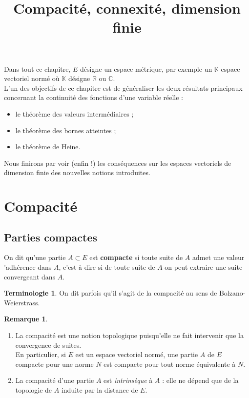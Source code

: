 \documentclass[french]{article}
\title{Compacité, connexité, dimension finie}
\date{}
\newcommand{\R}{\mathbb{R}}
\newcommand{\C}{\mathbb{C}}
\newcommand{\K}{\mathbb{K}}
\theoremstyle{plain}
\theoremstyle{definition}
\newtheorem*{rmq}{Remarque}
\newtheorem*{terminologie}{Terminologie}
\theoremstyle{remark}
\begin{document}
\tableofcontents

\newpage
\maketitle

Dans tout ce chapitre, $E$ désigne un espace métrique, par exemple un $\K$-espace vectoriel normé où $\K$ désigne $\R$ ou $\C$.\\
L'un des objectifs de ce chapitre est de généraliser les deux résultats principaux concernant la continuité des fonctions d'une variable réelle :
\begin{itemize}
	\item le théorème des valeurs intermédiaires ;
	\item le théorème des bornes atteintes ;
	\item le théorème de Heine.
\end{itemize}
Nous finirons par voir (enfin !) les conséquences sur les espaces vectoriels de dimension finie des nouvelles notions introduites.

\section{Compacité}%

\subsection{Parties compactes}%

\begin{dfn}
	On dit qu'une partie $A\subset E$ est \textbf{compacte} si toute suite de $A$ admet une valeur 'adhérence dans $A$, c'est-à-dire si de toute suite de $A$ on peut extraire une suite convergeant dans $A$.
\end{dfn}

\begin{terminologie}
	On dit parfois qu'il s'agit de la compacité au sens de Bolzano-Weierstrass.
\end{terminologie}

\begin{rmq}
	\begin{enumerate}
		\item La compacité est une notion topologique puisqu'elle ne fait intervenir que la convergence de suites. \\
		En particulier, si $E$ est un espace vectoriel normé, une partie $A$ de $E$ compacte pour une norme $N$ est compacte pour tout norme équivalente à $N$.
		\item La compacité d'une partie $A$ est \textit{intrinsèque} à $A$ : elle ne dépend que de la topologie de $A$ induite par la distance de $E$.
	\end{enumerate}
\end{rmq}
\end{document}

